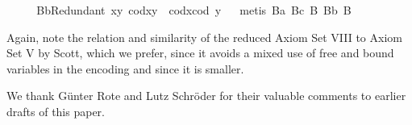 \begin{isabellebody}
\ \isanewline
\ \ \isamarkupfalse%
\ B{}bRedundant{\isacharcolon}\ {\isachardoublequoteopen}\isactrlbold {\isasymforall}x{\isachardot}\isactrlbold {\isasymforall}y{\isachardot}\ cod{\isacharparenleft}x{\isasymcdot}y{\isacharparenright}\ {\isasymcong}\ cod{\isacharparenleft}x{\isasymcdot}{\isacharparenleft}cod\ y{\isacharparenright}{\isacharparenright}{\isachardoublequoteclose}%
\isadelimproof
\ %
\endisadelimproof
%
\isatagproof
{}\isamarkupfalse%
\ {\isacharparenleft}metis\ B{}a\ B{}c\ B{}\ B{}b\ B{}{\isacharparenright}%
\endisatagproof
{\isafoldproof}%
%
\isadelimproof
%
\endisadelimproof
%
\begin{isamarkuptext}%
Again, note the relation and similarity of the reduced Axiom Set VIII to Axiom Set V by Scott, 
which we prefer, since it avoids a mixed use of free and bound variables in the encoding and 
since it is smaller.%
\end{isamarkuptext}\isamarkuptrue%
%
\isamarkuptrue%
%
\begin{isamarkuptext}%
We thank G\"unter Rote and Lutz Schr\"oder for their valuable comments to earlier drafts of this paper.%
\end{isamarkuptext}\isamarkuptrue%
%
\isadelimtheory
%
\endisadelimtheory
%
\isatagtheory
%
\endisatagtheory
{\isafoldtheory}%
%
\isadelimtheory
%
\endisadelimtheory
%
\end{isabellebody}%
